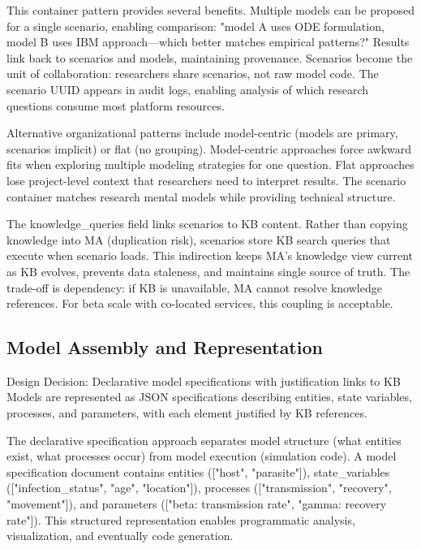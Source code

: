 \documentclass[12pt,a4paper]{article}
\begin{document}
This container pattern provides several benefits. Multiple models can be proposed for a single scenario, enabling comparison: "model A uses ODE formulation, model B uses IBM approach—which better matches empirical patterns?" Results link back to scenarios and models, maintaining provenance. Scenarios become the unit of collaboration: researchers share scenarios, not raw model code. The scenario UUID appears in audit logs, enabling analysis of which research questions consume most platform resources.

Alternative organizational patterns include model-centric (models are primary, scenarios implicit) or flat (no grouping). Model-centric approaches force awkward fits when exploring multiple modeling strategies for one question. Flat approaches lose project-level context that researchers need to interpret results. The scenario container matches research mental models while providing technical structure.

The knowledge\_queries field links scenarios to KB content. Rather than copying knowledge into MA (duplication risk), scenarios store KB search queries that execute when scenario loads. This indirection keeps MA's knowledge view current as KB evolves, prevents data staleness, and maintains single source of truth. The trade-off is dependency: if KB is unavailable, MA cannot resolve knowledge references. For beta scale with co-located services, this coupling is acceptable.

\subsection{Model Assembly and Representation}

\begin{rationale}{Design Decision: Declarative model specifications with justification links to KB}
Models are represented as JSON specifications describing entities, state variables, processes, and parameters, with each element justified by KB references.
\end{rationale}

The declarative specification approach separates model structure (what entities exist, what processes occur) from model execution (simulation code). A model specification document contains entities (["host", "parasite"]), state\_variables (["infection\_status", "age", "location"]), processes (["transmission", "recovery", "movement"]), and parameters (["beta: transmission rate", "gamma: recovery rate"]). This structured representation enables programmatic analysis, visualization, and eventually code generation.
\end{document}

